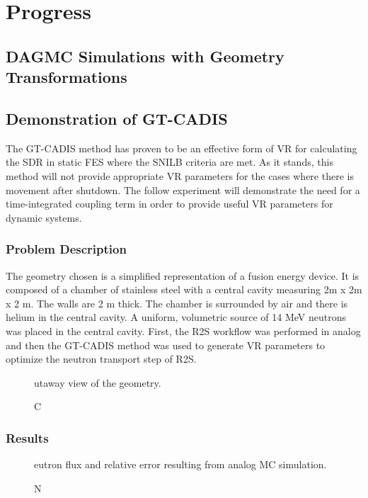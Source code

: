 \chapter{Progress} \label{ch:progress}

\section{DAGMC Simulations with Geometry Transformations}\label{sec:dagmc_trans}

\section{Demonstration of GT-CADIS} \label{sec:gtcadis}
The GT-CADIS method has proven to be an effective form of VR for calculating the
SDR in static FES where the SNILB criteria are met.  As it stands, this method
will not provide appropriate VR parameters for the cases where there is movement
after shutdown.  The follow experiment will demonstrate the need for a
time-integrated coupling term in order to provide useful VR parameters for
dynamic systems.
\subsection{Problem Description} \label{sec:description}
The geometry chosen is a simplified representation of a fusion energy device.
It is composed of a chamber of stainless steel with a central cavity measuring
2m x 2m x 2 m.  The walls are 2 m thick.  The chamber is surrounded by air and
there is helium in the central cavity.  A uniform, volumetric source of 14 MeV
neutrons was placed in the central cavity.  First, the R2S workflow was
performed in analog and then the GT-CADIS method was used to generate VR parameters
to optimize the neutron transport step of R2S.

\begin{figure}\label{fig:geom}
  \caption Cutaway view of the geometry.  
\end{figure}

\subsection{Results}
\begin{figure} \label{fig:nflux}
  \caption Neutron flux and relative error resulting from analog MC simulation.
\end{figure}

